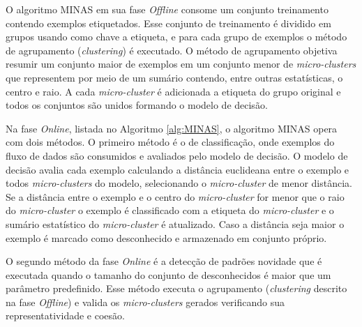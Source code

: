 \newcommand{\mcluster}{\emph{micro-cluster}\xspace}
\newcommand{\mclusters}{\emph{micro-clusters}\xspace}


O algoritmo MINAS em sua fase \emph{Offline} consome um conjunto treinamento
contendo exemplos etiquetados.
Esse conjunto de treinamento é dividido em grupos usando como chave a etiqueta,
e para cada grupo de exemplos o método de agrupamento (\emph{clustering}) é executado.
O método de agrupamento objetiva resumir um conjunto maior de exemplos em 
um conjunto menor de \mclusters que representem por meio de um sumário
contendo, entre outras estatísticas, o centro e raio.
A cada \mcluster é adicionada a etiqueta do grupo original e todos
os conjuntos são unidos formando o modelo de decisão.

Na fase \emph{Online}, listada no Algoritmo \ref{alg:MINAS}, o algoritmo MINAS
opera com dois métodos.
O primeiro método é o de classificação, onde exemplos do fluxo de dados
são consumidos e avaliados pelo modelo de decisão.
O modelo de decisão avalia cada exemplo calculando a distância euclideana
entre o exemplo e todos \mclusters do modelo, selecionando o
\mcluster de menor distância.
Se a distância entre o exemplo e o centro do \mcluster for menor que
o raio do \mcluster o exemplo é classificado com a etiqueta do \mcluster
e o sumário estatístico do \mcluster é atualizado.
Caso a distância seja maior o exemplo é marcado como desconhecido e armazenado
em conjunto próprio.

O segundo método da fase \emph{Online} é a detecção de padrões novidade
que é executada quando o tamanho do conjunto de desconhecidos é maior
que um parâmetro predefinido.
Esse método executa o agrupamento (\emph{clustering} descrito na fase
\emph{Offline}) e valida os \mclusters gerados verificando sua representatividade
e coesão.

